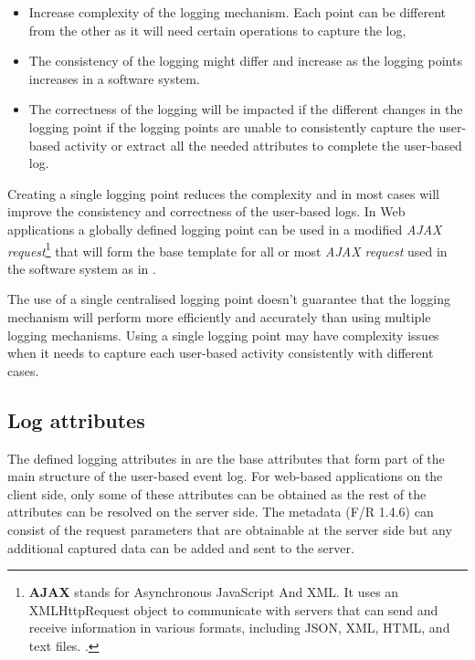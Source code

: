 \begin{itemize}
	\item Increase complexity of the logging mechanism. Each point can be different from the other as it will need certain operations to capture the log,
	\item The consistency of the logging might differ and increase as the logging points increases in a software system. 
	\item The correctness of the logging will be impacted if the different changes in the logging point if the logging points are unable to consistently capture the user-based activity or extract all the needed attributes to complete the user-based log.
\end{itemize}

Creating a single logging point reduces the complexity and in most cases will improve the consistency and correctness of the user-based logs. In Web applications a globally defined logging point can be used in a modified \textit{AJAX request}\footnote{\textbf{AJAX} stands for Asynchronous JavaScript And XML. It uses an XMLHttpRequest object to communicate with servers that can send and receive information in various formats, including JSON, XML, HTML, and text files. \cite{Mozilla2022a}.} that will form the base template for all or most \textit{AJAX request} used in the software system as in .\par The use of a single centralised logging point doesn't guarantee that the logging mechanism will perform more efficiently and accurately than using multiple logging mechanisms. Using a single logging point may have complexity issues when it needs to capture each user-based activity consistently with different cases.

\subsection{Log attributes}
The defined logging attributes in  are the base attributes that form part of the main structure of the user-based event log. For web-based applications on the
client side, only some of these attributes can be obtained as the rest of the attributes can be resolved on the server side. The metadata (F/R 1.4.6) can consist of the request parameters that are
obtainable at the server side but any additional captured data can be added and sent to the server.

